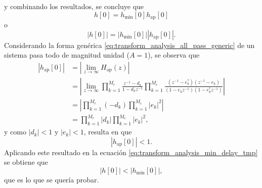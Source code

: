 \documentclass[a4paper]{report}
\begin{document}
y combinando los resultados, se concluye que 
\[
 h[0]=h_\textrm{min}[0]h_\textrm{ap}[0]
\]
o
\begin{equation}\label{eq:transform_analysis_min_delay_tmp}
 |h[0]|=|h_\textrm{min}[0]||h_\textrm{ap}[0]|. 
\end{equation}
Considerando la forma genérica \ref{eq:transform_analysis_all_pass_generic} de un sistema pasa todo de magnitud unidad (\(A=1\)), se observa que
\begin{align*}
 \left|h_\textrm{ap}[0]\right|&=\left|\lim_{z\to\infty}H_\textrm{ap}(z)\right|\\
  &=\left|\lim_{z\to\infty}\prod_{k=1}^{M_r}\frac{z^{-1}-d_k}{1-d_kz^{-1}}\prod_{k=1}^{M_c}\frac{(z^{-1}-e_k^*)(z^{-1}-e_k)}{(1-e_kz^{-1})(1-e^*_kz^{-1})}\right|\\
  &=\left|\prod_{k=1}^{M_r}(-d_k)\prod_{k=1}^{M_c}|e_k|^2\right|\\
  &=\prod_{k=1}^{M_r}|d_k|\prod_{k=1}^{M_c}|e_k|^2,
\end{align*}
y como \(|d_k|<1\) y \(|e_k|<1\), resulta en que
\[
 \left|h_\textrm{ap}[0]\right|<1.
\]
Aplicando este resultado en la ecuación \ref{eq:transform_analysis_min_delay_tmp} se obtiene que 
\[
 |h[0]|<|h_\textrm{min}[0]|,
\]
que es lo que se quería probar.
\end{document}
